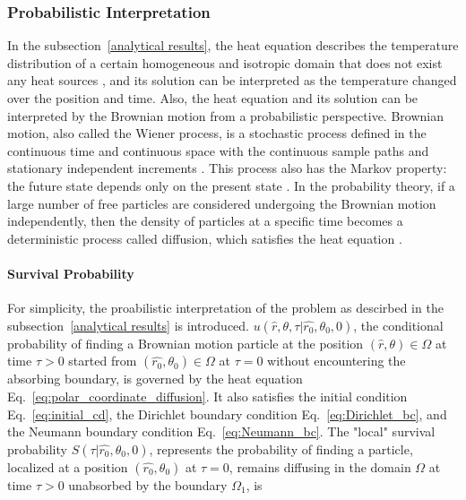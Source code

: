 \subsubsection{Probabilistic Interpretation}\label{probabilistic interpretation}

In the subsection~\ref{analytical results}, the heat equation describes the temperature distribution of a certain homogeneous and isotropic domain that does not exist any heat sources \cite{varadhan1980lectures}, and its solution can be interpreted as the temperature changed over the position and time. Also, the heat equation and its solution can be interpreted by the Brownian motion \cite{brown1828microscopical} from a probabilistic perspective. Brownian motion, also called the Wiener process, is a stochastic process \cite{karlin2014first} defined in the continuous time and continuous space with the continuous sample paths and stationary independent increments \cite{ito2012diffusion}. This process also has the Markov property: the future state depends only on the present state \cite{bharucha2012elements}. In the probability theory, if a large number of free particles are considered undergoing the Brownian motion independently, then the density of particles at a specific time becomes a deterministic process called diffusion, which satisfies the heat equation \cite{kac1947random}\cite{varadhan1980lectures}. 



\paragraph{Survival Probability}

\newcommand{\cpu}{u(\hat r, \theta, \tau | \hat{r_0}, \theta_0, 0)}

For simplicity, the proabilistic interpretation of the problem as descirbed in the subsection~\ref{analytical results} is introduced. $\cpu$, the conditional probability of finding a Brownian motion particle at the position $(\hat r, \theta) \in \Omega$ at time $\tau>0$ started from $(\hat{r_0}, \theta_0) \in \Omega$ at $\tau=0$ without encountering the absorbing boundary, is governed by the heat equation Eq.~\ref{eq:polar_coordinate_diffusion}. It also satisfies the initial condition Eq.~\ref{eq:initial_cd}, the Dirichlet boundary condition Eq.~\ref{eq:Dirichlet_bc}, and the Neumann boundary condition Eq.~\ref{eq:Neumann_bc}. The "local" survival probability $S(\tau | \hat{r_0}, \theta_0, 0)$, represents the probability of finding a particle, localized at a position $(\hat{r_0}, \theta_0)$ at $\tau=0$, remains diffusing in the domain $\Omega$ at time $\tau > 0$ unabsorbed by the boundary $\Omega_1$, is

